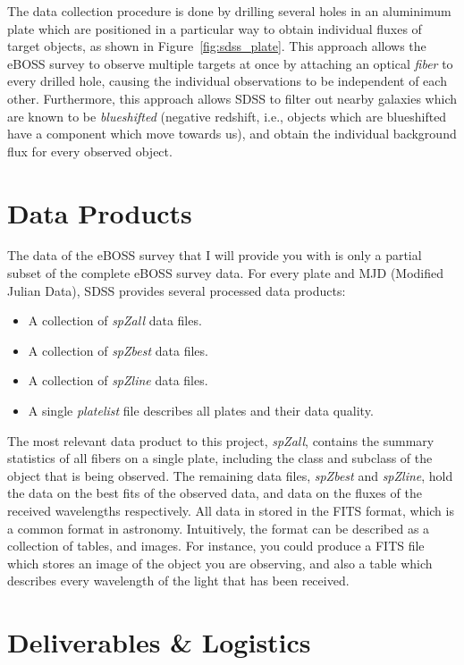 The data collection procedure is done by drilling several holes in an aluminimum plate which are positioned in a particular way to obtain individual fluxes of target objects, as shown in Figure~\ref{fig:sdss_plate}. This approach allows the eBOSS survey to observe multiple targets at once by attaching an optical \emph{fiber} to every drilled hole, causing the individual observations to be independent of each other. Furthermore, this approach allows SDSS to filter out nearby galaxies which are known to be \emph{blueshifted} (negative redshift, i.e., objects which are blueshifted have a component which move towards us), and obtain the individual background flux for every observed object.

\newpage
\section{Data Products}
\label{sec:data_products}

The data of the eBOSS survey that I will provide you with is only a partial subset of the complete eBOSS survey data. For every plate and MJD (Modified Julian Data), SDSS provides several processed data products:

\begin{itemize}
  \item A collection of \emph{spZall} data files.
  \item A collection of \emph{spZbest} data files.
  \item A collection of \emph{spZline} data files.
  \item A single \emph{platelist} file describes all plates and their data quality.
\end{itemize}

The most relevant data product to this project, \emph{spZall}, contains the summary statistics of all fibers on a single plate, including the class and subclass of the object that is being observed. The remaining data files, \emph{spZbest} and \emph{spZline}, hold the data on the best fits of the observed data, and data on the fluxes of the received wavelengths respectively. All data in stored in the FITS format, which is a common format in astronomy. Intuitively, the format can be described as a collection of tables, and images. For instance, you could produce a FITS file which stores an image of the object you are observing, and also a table which describes every wavelength of the light that has been received.

\section{Deliverables \& Logistics}
\label{sec:deliverables}

